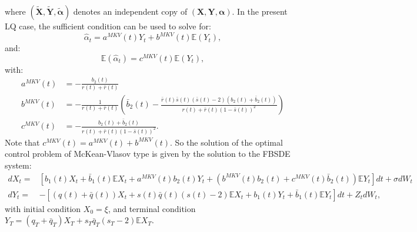 \documentclass[11pt]{article}
\begin{document}
where $(\boldsymbol{\tilde{X}},\boldsymbol{\tilde{Y}},\boldsymbol{\tilde{\alpha}})$ denotes an independent copy of $(\boldsymbol{X},\boldsymbol{Y},\boldsymbol{\alpha})$. In the present LQ case, the sufficient condition can be used to solve for:
\begin{equation*}
    \hat{\alpha}_t=a^{MKV}(t)Y_t+b^{MKV}(t)\mathbb{E}(Y_t),
\end{equation*}
and:
\begin{equation*}
    \mathbb{E}(\hat{\alpha}_t)=c^{MKV}(t)\mathbb{E}(Y_t),
\end{equation*}
with:
\begin{equation*}
\begin{split}
    a^{MKV}(t)&=-\frac{b_2(t)}{r(t)+\bar{r}(t)} \\
    b^{MKV}(t)&=-\frac{1}{r(t)+\bar{r}(t)}\left(\bar{b}_2(t)-\frac{\bar{r}(t)\bar{s}(t)(\bar{s}(t)-2)(b_2(t)+\bar{b}_2(t))}{r(t)+\bar{r}(t)(1-\bar{s}(t))^2} \right) \\
    c^{MKV}(t)&=-\frac{b_2(t)+\bar{b}_2(t)}{r(t)+\bar{r}(t)(1-\bar{s}(t))^2}.
\end{split}
\end{equation*}
Note that $c^{MKV}(t)=a^{MKV}(t)+b^{MKV}(t)$. So the solution of the optimal control problem of McKean-Vlasov type is given by the solution to the FBSDE system:
\begin{equation}
\begin{split}
        dX_t=&\left[b_1(t)X_t+\bar{b}_1(t) \mathbb{E}X_t+a^{MKV}(t)b_2(t)Y_t+(b^{MKV}(t)b_2(t)+c^{MKV}(t)\bar{b}_2(t))\mathbb{E}Y_t\right]dt+\sigma dW_t \\
        dY_t=&-\left[(q(t)+\bar{q}(t))X_t+s(t)\bar{q}(t)(s(t)-2)\mathbb{E}X_t+b_1(t)Y_t+\bar{b}_1(t)\mathbb{E}Y_t\right]dt +Z_t dW_t,
\end{split}
\label{eq:FBSDE_EMKV}
\end{equation}
with initial condition $X_0=\xi$, and terminal condition $Y_T=(q_T+\bar{q}_T)X_T+s_T\bar{q}_T(s_T-2)\mathbb{E}X_T$.
\end{document}
